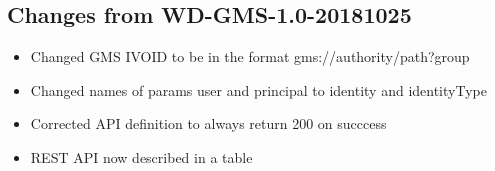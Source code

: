 \documentclass[11pt,a4paper]{ivoa}
\begin{document}
\subsection{Changes from WD-GMS-1.0-20181025}
\begin{itemize}
\item{Changed GMS IVOID to be in the format gms://authority/path?group}
\item{Changed names of params user and principal to identity and identityType}
\item{Corrected API definition to always return 200 on succcess}
\item{REST API now described in a table}
\end{itemize}



\end{document}
